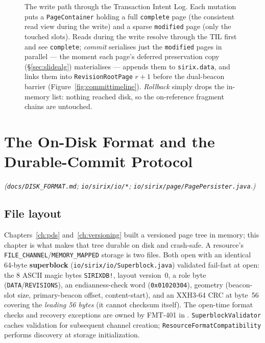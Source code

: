 \documentclass[11pt,a4paper,oneside]{report}
\theoremstyle{sirixthm}
\newcommand{\code}[1]{\texttt{#1}}
\begin{document}
\begin{figure}[t]
\caption{The write path through the Transaction Intent Log. Each mutation puts a \code{PageContainer}
holding a full \code{complete} page (the consistent read view during the write) and a sparse
\code{modified} page (only the touched slots). Reads during the write resolve through the TIL first and
see \code{complete}; \emph{commit} serialises just the \code{modified} pages in parallel --- the moment
each page's deferred preservation copy (\S\ref{sec:slidealg}) materialises --- appends them to
\code{sirix.data}, and links them into \code{RevisionRootPage} $r{+}1$ before the dual-beacon barrier
(Figure~\ref{fig:committimeline}). \emph{Rollback} simply drops the in-memory list: nothing reached disk,
so the on-reference fragment chains are untouched.}
\label{fig:til}
\end{figure}

\chapter{The On-Disk Format and the Durable-Commit Protocol}
\label{ch:ondisk}

\noindent\textit{(\code{docs/DISK\_FORMAT.md}; \code{io/sirix/io/*};
\code{io/sirix/page/PagePersister.java}.)}

\section{File layout}

Chapters~\ref{ch:pds} and~\ref{ch:versioning} built a versioned page tree in memory; this chapter
is what makes that tree durable on disk and crash-safe. A resource's
\code{FILE\_CHANNEL}/\allowbreak\code{MEMORY\_MAPPED} storage is two files. Both open
with an identical 64-byte \textbf{superblock} (\code{io/sirix/io/Superblock.java})
validated fail-fast at open: the 8 ASCII magic bytes \code{SIRIXDB!}, layout version~0, a
role byte (\code{DATA}/\allowbreak\code{REVISIONS}), an endianness-check word (\code{0x01020304}),
geometry (beacon-slot size, primary-beacon offset, content-start), and an XXH3-64 CRC at
byte~56 covering the \emph{leading 56 bytes} (it cannot checksum itself). The open-time format
checks and recovery exceptions are owned by FMT-401 in .
\code{SuperblockValidator} caches validation for subsequent channel creation;
\code{ResourceFormatCompatibility} performs discovery at storage initialization.
\end{document}
